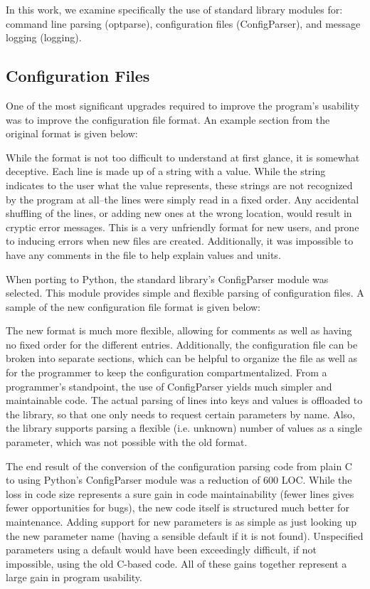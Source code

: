 \documentclass[twocolumn]{article}
\begin{document}
In this work, we examine specifically the use of standard library modules for:
command line parsing (optparse), configuration files (ConfigParser), and message logging (logging).

\subsection{Configuration Files}
One of the most significant upgrades required to improve the program's usability
was to improve the configuration file format. An example section from the original
format is given below:

  

While the format is not too difficult to understand at first glance, it is
somewhat deceptive. Each line is made up of a string with a value. While the
string indicates to the user what the value represents, these strings are not
recognized by the program at all--the lines were simply read in a fixed order.
Any accidental shuffling of the lines, or adding new ones at the wrong location,
would result in cryptic error messages. This is a very unfriendly format for new
users, and prone to inducing errors when new files are created. Additionally, it
was impossible to have any comments in the file to help explain values and
units.

When porting to Python, the standard library's ConfigParser module was selected.
This module provides simple and flexible parsing of configuration files. 
A sample of the new configuration file format is given below:



The new format is much more flexible, allowing for comments as well as having
no fixed order for the different entries. Additionally, the configuration file
can be broken into separate sections, which can be helpful to organize the file
as well as for the programmer to keep the configuration compartmentalized. From
a programmer's standpoint, the use of ConfigParser yields much simpler and 
maintainable code. The actual parsing of lines into keys and values is offloaded to
the library, so that one only needs to request certain parameters by name.
Also, the library supports parsing a flexible (i.e. unknown) number of values
as a single parameter, which was not possible with the old format.

The end result of the conversion of the configuration parsing code from plain C
to using Python's ConfigParser module was a reduction of 600 LOC. While the loss
in code size represents a sure gain in code maintainability (fewer lines gives
fewer opportunities for bugs), the new code itself is structured much better
for maintenance. Adding support for new parameters is as simple as just looking
up the new parameter name (having a sensible default if it is not found). Unspecified
parameters using a default would have been exceedingly difficult, if not impossible,
using the old C-based code. All of these gains together represent a large gain
in program usability.
\end{document}
